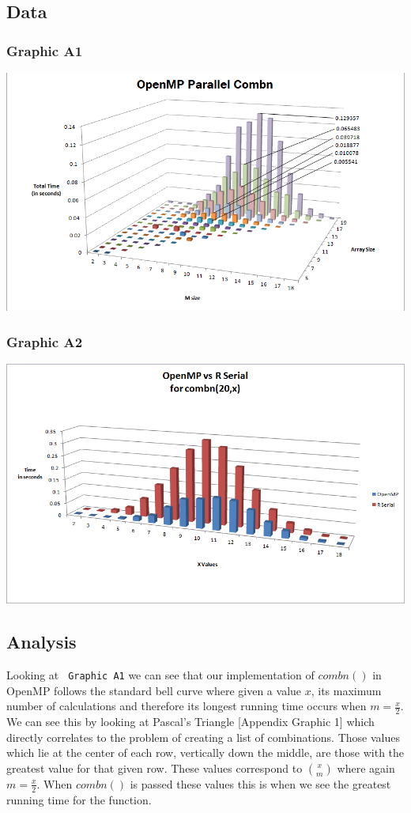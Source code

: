 \documentclass[titlepage, 11pt]{article}
\begin{document}
\subsection{Data}
\subsubsection{Graphic A1}
\includegraphics[scale = 0.5]{3D-OMP.png} \\
\subsubsection{Graphic A2}
\includegraphics[scale = 0.5]{OMPvsR.png}

\subsection{Analysis}
Looking at \verb; Graphic A1; we can see that our implementation of $combn()$ in OpenMP follows the standard bell curve where given a value $x$, its maximum number of calculations and therefore its longest running time occurs when $m = \frac{x}{2}$. We can see this by looking at Pascal's Triangle [Appendix Graphic 1] which directly correlates to the problem of creating a list of combinations. Those values which lie at the center of each row, vertically down the middle, are those with the greatest value for that given row. These values correspond to ${x \choose m}$ where again $m = \frac{x}{2}$. When $combn()$ is passed these values this is when we see the greatest running time for the function. \\
\end{document}

